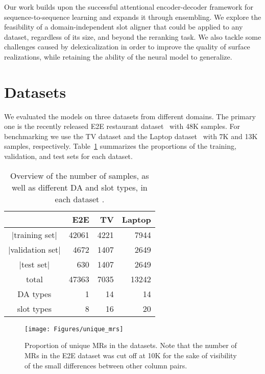 \documentclass[11pt,a4paper]{article}
\begin{document}
Our work builds upon the successful attentional encoder-decoder framework for sequence-to-sequence learning and expands it through ensembling. We explore the feasibility of a domain-independent slot aligner that could be applied to any dataset, regardless of its size, and beyond the reranking task. We also tackle some challenges caused by delexicalization in order to improve the quality of surface realizations, while retaining the ability of the neural model to generalize.



\section{Datasets}
\label{sec:datasets}


We evaluated the models on three datasets from different domains. The primary one is the recently released E2E restaurant dataset~\cite{novikova2017e2e} with 48K samples. For benchmarking we use the TV dataset and the Laptop dataset~\cite{wen2016multi} with 7K and 13K samples, respectively. Table~\ref{table:dataset_overview} summarizes the proportions of the training, validation, and test sets for each dataset.

\begin{table}
  \small
  \centering
  \begin{tabular}{c r r r}
    \toprule
    & \textbf{E2E}	& \textbf{TV}	& \textbf{Laptop} \\
    \midrule
    $|$training set$|$		& 42061	& 4221	& 7944 \\
    $|$validation set$|$	& 4672	& 1407	& 2649 \\
    $|$test set$|$			& 630	& 1407	& 2649 \\
    total					& 47363	& 7035	& 13242 \\
    \midrule
    DA types	& 1		& 14	& 14 \\
    slot types	& 8		& 16	& 20 \\
    \bottomrule
  \end{tabular}
  \vspace{-0.1cm}
  \caption{Overview of the number of samples, as well as different DA and slot types, in each dataset
  \label{table:dataset_overview}.}
  \vspace{-0.2cm}
\end{table}

\begin{figure}
  \begin{center}
  	\texttt{[image: Figures/unique\_mrs]}
  \end{center}
  \vspace{-0.5cm}
  \caption{Proportion of unique MRs in the datasets. Note that the number of MRs in the E2E dataset was cut off at 10K for the sake of visibility of the small differences between other column pairs.}
  \label{fig:unique_mrs}
  \vspace{-0.2cm}
\end{figure}
\end{document}
